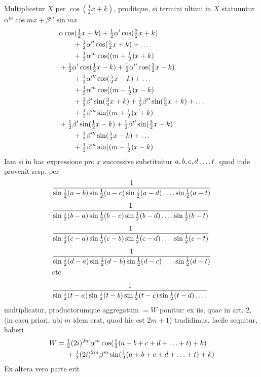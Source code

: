 Multiplicetur $X$ per $\cos(\tfrac12x+k)$, proditque, si termini ultimi in $X$ statuuntur $\alpha^m\cos mx+\beta^m\sin mx$
\[
\begin{aligned}
&\alpha\cos(\tfrac12x+k)+\tfrac12\alpha'\cos(\tfrac32x+k)\\&\qquad+\tfrac12\alpha''\cos(\tfrac52x+k)+\mathinner{.\,.\,.\,.}\\
&\hspace{2.01em}+\tfrac12\alpha^m\cos((m+\tfrac12)x+k)\\
&+\tfrac12\alpha'\cos(\tfrac12x-k)+\tfrac12\alpha''\cos(\tfrac32x-k)\\&\qquad+\tfrac12\alpha'''\cos(\tfrac52x-k)+\mathinner{.\,.\,.}\\
&\hspace{2.01em}+\tfrac12\alpha^m\cos((m-\tfrac12)x-k)\\
&\hspace{2em}+\tfrac12\beta'\sin(\tfrac32x+k)+\tfrac12\beta''\sin(\tfrac52x+k)+\mathinner{.\,.\,.}\\
&\hspace{2.01em}+\tfrac12\beta^m\sin((m+\tfrac12)x+k)\\
&+\tfrac12\beta'\sin(\tfrac12x-k)+\tfrac12\beta''\sin(\tfrac32x-k)\\&\qquad+\tfrac12\beta'''\sin(\tfrac52x-k)+\mathinner{.\,.\,.}\\
&\hspace{2.01em}+\tfrac12\beta^m\sin((m-\tfrac12)x-k)
\end{aligned}
\]
Iam si in hac expressione pro $x$ successive substituitur $a,b,c,d\mathinner{.\,.\,.\,.}t$, quod
inde provenit resp. per
\[
\begin{aligned}
&\frac{1}{\sin\tfrac12(a-b)\sin\tfrac12(a-c)\sin\tfrac12(a-d)\mathinner{.\,.\,.\,.}\sin\tfrac12(a-t)}\\[1ex]
&\frac{1}{\sin\tfrac12(b-a)\sin\tfrac12(b-c)\sin\tfrac12(b-d)\mathinner{.\,.\,.\,.}\sin\tfrac12(b-t)}\\[1ex]
&\frac{1}{\sin\tfrac12(c-a)\sin\tfrac12(c-b)\sin\tfrac12(c-d)\mathinner{.\,.\,.\,.}\sin\tfrac12(c-t)}\\[1ex]
&\frac{1}{\sin\tfrac12(d-a)\sin\tfrac12(d-b)\sin\tfrac12(d-c)\mathinner{.\,.\,.\,.}\sin\tfrac12(d-t)}\\
&\text{etc.}\\[1ex]
&\frac{1}{\sin\tfrac12(t-a)\sin\tfrac12(t-b)\sin\tfrac12(t-c)\sin\tfrac12(t-d)\mathinner{.\,.\,.\,.}}
\end{aligned}
\]
multiplicatur, productorumque aggregatum $=W$ ponitur: ex iis, quae in art. 2,
(in casu priori, ubi $m$ idem erat, quod hic est $2m+1$) tradidimus, facile sequitur, haberi
\[
\begin{aligned}
W={}&\tfrac12(2i)^{2m}\alpha^m\cos(\tfrac12(a+b+c+d+\mathinner{.\,.\,.}+t)+k)\\
&+\tfrac12(2i)^{2m}\beta^m\sin(\tfrac12(a+b+c+d+\mathinner{.\,.\,.}+t)+k)
\end{aligned}
\]
Ex altera vero parte erit
\endgroup
